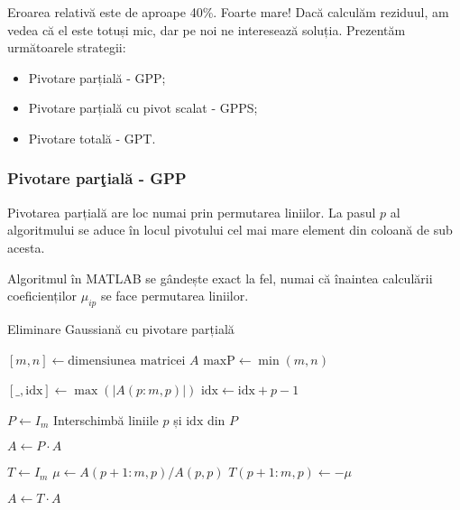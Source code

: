 \documentclass{exam}
\newcommand{\octavescript}[2]{
	
}
\begin{document}
Eroarea relativă este de aproape 40\%. Foarte mare! Dacă calculăm reziduul,
am vedea că el este totuși mic, dar pe noi ne interesează soluția. Prezentăm
următoarele strategii:

\begin{itemize}
	\item Pivotare parțială - GPP;
	\item Pivotare parțială cu pivot scalat - GPPS;
	\item Pivotare totală - GPT.
\end{itemize}

\subsubsection{Pivotare parţială - GPP}

Pivotarea parțială are loc numai prin permutarea liniilor. La pasul $p$ al
algoritmului se aduce în locul pivotului cel mai mare element din coloană de sub
acesta.

Algoritmul în MATLAB se gândește exact la fel, numai că înaintea calculării
coeficienților $\mu_{ip}$ se face permutarea liniilor.

\begin{algorithm}
	\caption{Eliminare Gaussiană cu pivotare parțială}
	\begin{algorithmic}[1]
		\State \( [m, n] \gets \text{dimensiunea matricei } A \)
		\State \( \text{maxP} \gets \min(m, n) \) 

		\State \( [\_, \text{idx}] \gets \max(|A(p:m, p)|) \) 
		\State \( \text{idx} \gets \text{idx} + p - 1 \) 

		\State \( P \gets I_m \) 
		\State Interschimbă liniile \( p \) și \( \text{idx} \) din \( P \)

		\State \( A \gets P \cdot A \) 

		\State \( T \gets I_m \) 
		\State \( \mu \gets A(p+1:m, p) / A(p, p) \) 
		\State \( T(p+1:m, p) \gets -\mu \) 

		\State \( A \gets T \cdot A \) 
		\EndFor
	\end{algorithmic}
\end{algorithm}
\end{document}
